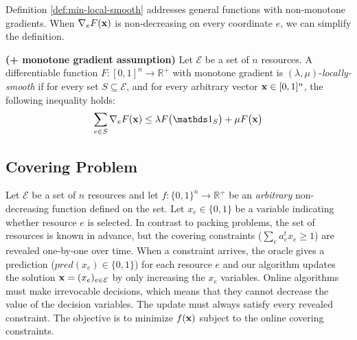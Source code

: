 Definition \ref{def:min-local-smooth} addresses general functions with non-monotone gradients. When $\nabla_{e} F(\mathbf{x})$ is non-decreasing on every coordinate $e$, we can simplify the definition.

\begin{definition} \textbf{(+ monotone gradient assumption)} \label{def:min-local-smooth-increasing}
    Let $\mathcal{E}$ be a set of $n$ resources.
    A differentiable function $F: [0,1]^{n} \rightarrow \mathbb{R}^{+}$ with monotone gradient is $(\lambda,\mu)$-\emph{locally-smooth} if for every set $S \subseteq \mathcal{E}$, and for every arbitrary vector $\mathbf{x} \in [0,1]^{n}$, the following inequality holds:
    \begin{equation*} \label{eq:min-local-smooth-increasing}
        \sum_{e \in S} \nabla_{e} F(\vect{x}) \leq \lambda F\bigl( \one_{S} \bigr) + \mu F\bigl( \vect{x} \bigr)
    \end{equation*}
\end{definition}


\subsection{Covering Problem}
Let $\mathcal{E}$ be a set of $n$ resources
and let $f: \{0,1\}^{n} \rightarrow \mathbb{R}^{+}$ be an  \emph{arbitrary} non-decreasing function defined on the set.
Let $x_{e} \in \{0,1\}$ be a variable indicating whether resource $e$ is selected.
In contrast to packing problems, the set of resources is known in advance, but the covering constraints ($\sum_{e} a_{e}^{t} x_{e} \geq 1$) are revealed one-by-one over time. When a constraint arrives, the oracle gives a prediction ($pred(x_{e}) \in \{0,1\}$) for each resource $e$ and our algorithm updates the solution $\mathbf{x} = (x_{e})_{e \in \mathcal{E}}$ by only increasing the $x_e$ variables. Online algorithms must make irrevocable decisions, which means that they cannot decrease the value of the decision variables. The update must always satisfy every revealed constraint.
The objective is to minimize $f(\mathbf{x})$ subject to the online covering constraints.
